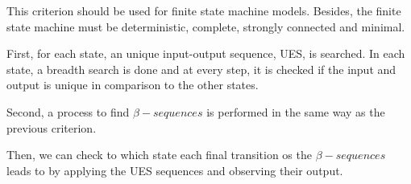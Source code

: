 \begin{itemize}
This criterion should be used for finite state machine models. Besides, the finite state machine must be deterministic, complete, strongly connected and minimal. 

First, for each state, an unique input-output sequence, UES, is searched. In each state, a breadth search is done and at every step, it is checked if the input and output is unique in comparison to the other states.

Second, a process to find $\beta-sequences$ is performed in the same way as the previous criterion.

Then, we can check to which state each final transition os the $\beta-sequences$ leads to by applying the UES sequences and observing their output.

\end{itemize}


